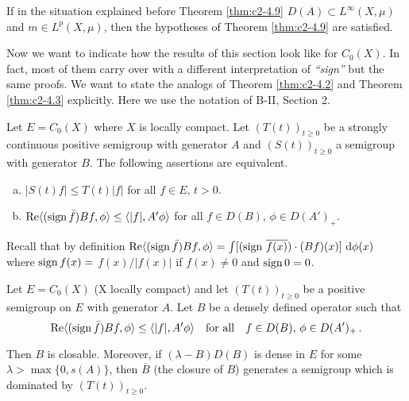\begin{example}\label{ex:c2-4.11}
If in the situation explained before Theorem \ref{thm:c2-4.9}  
$D(A) \subset L^{\infty}(X,\mu)$ and $m \in L^{p}(X,\mu)$, then the hypotheses of Theorem \ref{thm:c2-4.9}   are satisfied.
\end{example}

Now we want to indicate how the results of this section look like for $C_{0}(X)$.
In fact, most of them carry over with a different interpretation of \emph{``sign''} but the same proofs.
We want to state the analogs of Theorem \ref{thm:c2-4.2}   and Theorem \ref{thm:c2-4.3}   explicitly.
Here we use the notation of B-II, Section 2.

\begin{theorem}\label{thm:c2-4.12}
Let $E = C_{0}(X)$ where $X$ is locally compact.
Let $(T(t))_{t \geq 0}$ be a strongly continuous positive semigroup with
generator $A$ and $(S(t))_{t \geq 0}$ a semigroup with generator $B$.
The following assertions are equivalent.
\begin{enumerate}[(a)]
\item \label{thm:c2-4.12-1}
$|S(t)f| \leq T(t)|f|$ for all $f \in E$, $t > 0$.
\item \label{thm:c2-4.12-2}
$\mathop{}\!\mathrm{Re}\langle(\operatorname{sign}  \bar{f})Bf,\phi\rangle \leq \langle|f|,A'\phi\rangle$ for all $f \in D(B)$, $\phi \in D(A')_{+}$.
\end{enumerate}
\end{theorem}

Recall that by definition
$\mathop{}\!\mathrm{Re}  \langle(\operatorname{sign}  \bar{f})Bf,\phi\rangle = \int [\text{(sign } \overline{f(x)})\cdot(Bf)(x)] \, \mathop{}\!\mathrm{d}{\phi(x)}$ where $\operatorname{sign}  f(x) =$
$f(x)/|f(x)|$ if $f(x) \neq 0$ and $\operatorname{sign}  0 = 0$.

\begin{theorem}\label{thm:c2-4.13}
Let $E = C_{0}(X)$ (X locally compact) and let $(T(t))_{t \geq 0}$
be a positive semigroup on $E$ with generator $A$.
Let $B$ be a densely defined operator such that
\begin{equation}\label{eq:c2-4.12}
\mathop{}\!\mathrm{Re}  \langle(\operatorname{sign}  \bar{f})Bf,\phi\rangle \leq \langle|f|,A'\phi\rangle \quad 
\text{for all} \quad f \in D(B),\, \phi \in D(A')_{+}\,.
\end{equation}

Then $B$ is closable.
Moreover, if $(\lambda - B)D(B)$ is dense in $E$ for some $\lambda > \max\{0,s(A)\}$, then $\overline{B}$ (the closure of $B$) generates a
semigroup which is dominated by $(T(t))_{t \geq 0}$.
\end{theorem}

